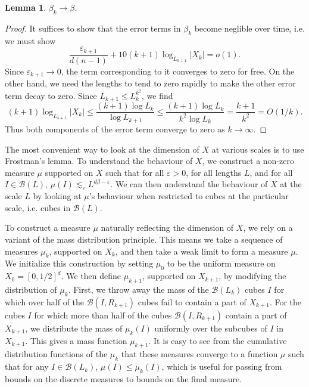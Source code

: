 \documentclass{article}
\theoremstyle{plain}
\newtheorem{lemma}{Lemma}
\theoremstyle{plain}
\begin{document}
\begin{lemma}
	$\beta_k \to \beta$.
\end{lemma}
\begin{proof}
	It suffices to show that the error terms in $\beta_k$ become neglible over time, i.e. we must show
	\[ \frac{\varepsilon_{k+1}}{d(n-1)} + 10(k+1) \log_{L_{k+1}} |X_k| = o(1). \]
	Since $\varepsilon_{k+1} \to 0$, the term corresponding to it converges to zero for free. On the other hand, we need the lengths to tend to zero rapidly to make the other error term decay to zero. Since $L_{k+1} \leq L_k^{k^2}$, we find
	\[ (k+1) \log_{L_{k+1}} |X_k| \leq \frac{(k+1) \log L_k}{\log L_{k+1}} \leq \frac{(k+1) \log L_k}{k^2 \log L_k} = \frac{k+1}{k^2} = O(1/k). \]
	Thus both components of the error term converge to zero as $k \to \infty$.
\end{proof}

The most convenient way to look at the dimension of $X$ at various scales is to use Frostman's lemma. To understand the behaviour of $X$, we construct a non-zero measure $\mu$ supported on $X$ such that for all $\varepsilon > 0$, for all lengths $L$, and for all $I \in \mathcal{B}(L)$, $\mu(I) \lesssim_\varepsilon L^{d\beta - \varepsilon}$. We can then understand the behaviour of $X$ at the scale $L$ by looking at $\mu$'s behaviour when restricted to cubes at the particular scale, i.e. cubes in $\mathcal{B}(L)$.

To construct a measure $\mu$ naturally reflecting the dimension of $X$, we rely on a variant of the mass distribution principle. This means we take a sequence of measures $\mu_k$, supported on $X_k$, and then take a weak limit to form a measure $\mu$. We initialize this construction by setting $\mu_0$ to be the uniform measure on $X_0 = [0,1/2]^d$. We then define $\mu_{k+1}$, supported on $X_{k+1}$, by modifying the distribution of $\mu_k$. First, we throw away the mass of the $\mathcal{B}(L_k)$ cubes $I$ for which over half of the $\mathcal{B}(I,R_{k+1})$ cubes fail to contain a part of $X_{k+1}$. For the cubes $I$ for which more than half of the cubes $\mathcal{B}(I,R_{k+1})$ contain a part of $X_{k+1}$, we distribute the mass of $\mu_k(I)$ uniformly over the subcubes of $I$ in $X_{k+1}$. This gives a mass function $\mu_{k+1}$. It is easy to see from the cumulative distribution functions of the $\mu_k$ that these measures converge to a function $\mu$ such that for any $I \in \mathcal{B}(L_k)$, $\mu(I) \leq \mu_k(I)$, which is useful for passing from bounds on the discrete measures to bounds on the final measure.
\end{document}
